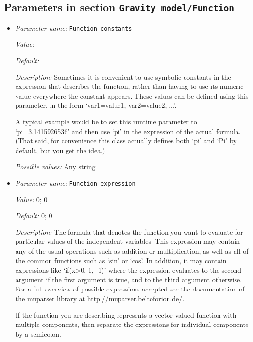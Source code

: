 \subsection{Parameters in section \tt Gravity model/Function}
\label{parameters:Gravity_20model/Function}

\begin{itemize}
\item {\it Parameter name:} {\tt Function constants}
\label{parameters:Gravity model/Function/Function constants}


{\it Value:} 


{\it Default:} 


{\it Description:} Sometimes it is convenient to use symbolic constants in the expression that describes the function, rather than having to use its numeric value everywhere the constant appears. These values can be defined using this parameter, in the form `var1=value1, var2=value2, ...'.

A typical example would be to set this runtime parameter to `pi=3.1415926536' and then use `pi' in the expression of the actual formula. (That said, for convenience this class actually defines both `pi' and `Pi' by default, but you get the idea.)


{\it Possible values:} Any string
\item {\it Parameter name:} {\tt Function expression}
\label{parameters:Gravity model/Function/Function expression}


{\it Value:} 0; 0


{\it Default:} 0; 0


{\it Description:} The formula that denotes the function you want to evaluate for particular values of the independent variables. This expression may contain any of the usual operations such as addition or multiplication, as well as all of the common functions such as `sin' or `cos'. In addition, it may contain expressions like `if(x>0, 1, -1)' where the expression evaluates to the second argument if the first argument is true, and to the third argument otherwise. For a full overview of possible expressions accepted see the documentation of the muparser library at http://muparser.beltoforion.de/.

If the function you are describing represents a vector-valued function with multiple components, then separate the expressions for individual components by a semicolon.



\end{itemize}
